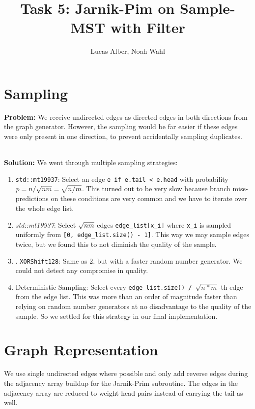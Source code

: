 \documentclass{article}
\begin{document}
\title{Task 5: Jarnik-Pim on Sample-MST with Filter}
\author{Lucas Alber, Noah Wahl}
\maketitle

\section{Sampling}
\textbf{Problem:} We receive undirected edges as directed edges in both directions from the graph generator.
However, the sampling would be far easier if these edges were only present in one direction, to prevent accidentally sampling duplicates.

\noindent \\
\textbf{Solution:} We went through multiple sampling strategies:

\begin{enumerate}
  \item \texttt{std::mt19937}: Select an edge \texttt{e if e.tail < e.head} with probability $p = n / \sqrt{n\*m} = \sqrt{n/m}$.
This turned out to be very slow because branch miss-predictions on these conditions are very common and we have to iterate over the whole edge list.

\item \textit{std::mt19937}: Select $\sqrt{n\*m}$ edges \texttt{edge\_list[x\_i]} where \texttt{x\_i} is sampled uniformly from \texttt{[0, edge\_list.size() - 1]}.
This way we may sample edges twice, but we found this to not diminish the quality of the sample.

\item. \texttt{XORShift128}: Same as 2. but with a faster random number generator.
We could not detect any compromise in quality.

\item Deterministic Sampling: Select every \texttt{edge\_list.size() / $\sqrt{n*m}$}-th edge from the edge list.
This was more than an order of magnitude faster than relying on random number generators at no disadvantage to the quality of the sample.
So we settled for this strategy in our final implementation.
\end{enumerate}

\section{Graph Representation}
We use single undirected edges where possible and only add reverse edges during the adjacency array buildup for the Jarnik-Prim subroutine.
The edges in the adjacency array are reduced to weight-head pairs instead of carrying the tail as well.
\end{document}
